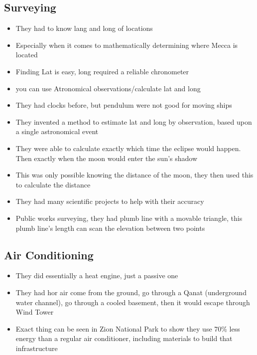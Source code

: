 \documentclass{article}
\begin{document}
\subsection{Surveying}
\begin{itemize}
  \item They had to know lang and long of locations
  \item Especially when it comes to mathematically determining where Mecca is located
  \item Finding Lat is easy, long required a reliable chronometer
  \item you can use Atronomical observations/calculate lat and long
  \item They had clocks before, but pendulum were not good for moving ships
  \item They invented a method to estimate lat and long by observation, based upon
    a single astronomical event
  \item They were able to calculate exactly which time the eclipse would happen.
    Then exactly when the moon would enter the sun's shadow
  \item This was only possible knowing the distance of the moon, they then used this to calculate the distance
  \item They had many scientific projects to help with their accuracy
  \item Public works surveying, they had plumb line with a movable triangle,
    this plumb line's length can scan the elevation between two points
\end{itemize}

\subsection{Air Conditioning}
\begin{itemize}
  \item They did essentially a heat engine, just a passive one
  \item They had hor air come from the ground, go through a Qanat
    (underground water channel), go through a cooled basement,
    then it would escape through Wind Tower
  \item Exact thing can be seen in Zion National Park to show
    they use 70\% less energy than a regular air conditioner,
    including materials to build that infrastructure
\end{itemize}
\end{document}
